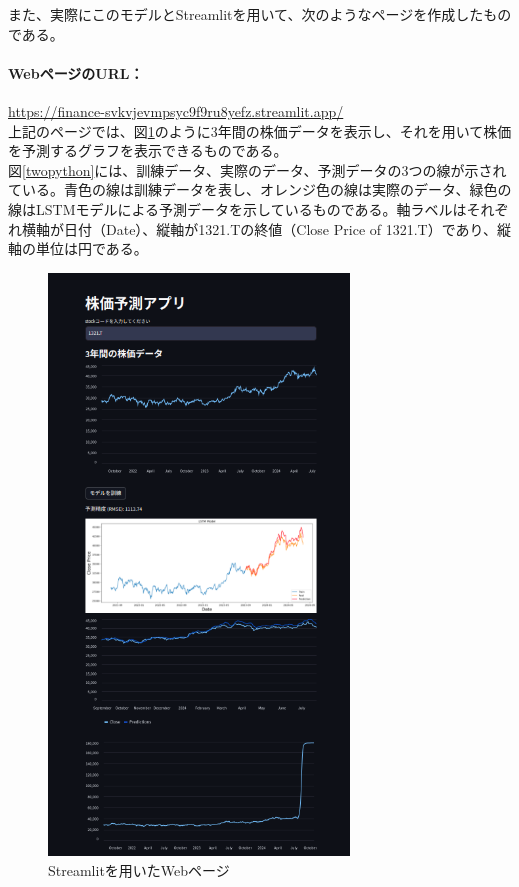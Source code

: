 \documentclass[a4paper, 11pt, titlepage]{jsarticle}
\begin{document}
\indent また、実際にこのモデルとStreamlitを用いて、次のようなページを作成したものである。\\
\paragraph{WebページのURL：}\url{https://finance-svkvjevmpsyc9f9ru8yefz.streamlit.app/} \\
\indent 上記のページでは、図\ref{Streamlit}のように3年間の株価データを表示し、それを用いて株価を予測するグラフを表示できるものである。 \\
\indent 図\ref{twopython}には、訓練データ、実際のデータ、予測データの3つの線が示されている。青色の線は訓練データを表し、オレンジ色の線は実際のデータ、緑色の線はLSTMモデルによる予測データを示しているものである。軸ラベルはそれぞれ横軸が日付（Date）、縦軸が1321.Tの終値（Close Price of 1321.T）であり、縦軸の単位は円である。

\begin{figure}[htbp]
  \centering
  \includegraphics[width=80mm]{./image/image.png}
  \caption{Streamlitを用いたWebページ}
  \label{Streamlit}
\end{figure}
\clearpage
\end{document}
